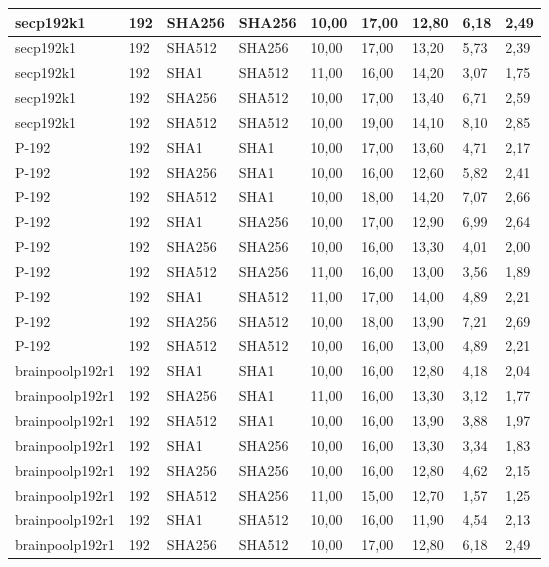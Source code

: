 \begin{longtable}{| l | l | l | l | l |l |l |l |l |}
secp192k1 & 192 & SHA256 & SHA256 & 10,00 & 17,00 & 12,80 & 6,18 & 2,49 \\ \hline 
secp192k1 & 192 & SHA512 & SHA256 & 10,00 & 17,00 & 13,20 & 5,73 & 2,39 \\ \hline 
secp192k1 & 192 & SHA1 & SHA512 & 11,00 & 16,00 & 14,20 & 3,07 & 1,75 \\ \hline 
secp192k1 & 192 & SHA256 & SHA512 & 10,00 & 17,00 & 13,40 & 6,71 & 2,59 \\ \hline 
secp192k1 & 192 & SHA512 & SHA512 & 10,00 & 19,00 & 14,10 & 8,10 & 2,85 \\ \hline 
P-192 & 192 & SHA1 & SHA1 & 10,00 & 17,00 & 13,60 & 4,71 & 2,17 \\ \hline 
P-192 & 192 & SHA256 & SHA1 & 10,00 & 16,00 & 12,60 & 5,82 & 2,41 \\ \hline 
P-192 & 192 & SHA512 & SHA1 & 10,00 & 18,00 & 14,20 & 7,07 & 2,66 \\ \hline 
P-192 & 192 & SHA1 & SHA256 & 10,00 & 17,00 & 12,90 & 6,99 & 2,64 \\ \hline 
P-192 & 192 & SHA256 & SHA256 & 10,00 & 16,00 & 13,30 & 4,01 & 2,00 \\ \hline 
P-192 & 192 & SHA512 & SHA256 & 11,00 & 16,00 & 13,00 & 3,56 & 1,89 \\ \hline 
P-192 & 192 & SHA1 & SHA512 & 11,00 & 17,00 & 14,00 & 4,89 & 2,21 \\ \hline 
P-192 & 192 & SHA256 & SHA512 & 10,00 & 18,00 & 13,90 & 7,21 & 2,69 \\ \hline 
P-192 & 192 & SHA512 & SHA512 & 10,00 & 16,00 & 13,00 & 4,89 & 2,21 \\ \hline 
brainpoolp192r1 & 192 & SHA1 & SHA1 & 10,00 & 16,00 & 12,80 & 4,18 & 2,04 \\ \hline 
brainpoolp192r1 & 192 & SHA256 & SHA1 & 11,00 & 16,00 & 13,30 & 3,12 & 1,77 \\ \hline 
brainpoolp192r1 & 192 & SHA512 & SHA1 & 10,00 & 16,00 & 13,90 & 3,88 & 1,97 \\ \hline 
brainpoolp192r1 & 192 & SHA1 & SHA256 & 10,00 & 16,00 & 13,30 & 3,34 & 1,83 \\ \hline 
brainpoolp192r1 & 192 & SHA256 & SHA256 & 10,00 & 16,00 & 12,80 & 4,62 & 2,15 \\ \hline 
brainpoolp192r1 & 192 & SHA512 & SHA256 & 11,00 & 15,00 & 12,70 & 1,57 & 1,25 \\ \hline 
brainpoolp192r1 & 192 & SHA1 & SHA512 & 10,00 & 16,00 & 11,90 & 4,54 & 2,13 \\ \hline 
brainpoolp192r1 & 192 & SHA256 & SHA512 & 10,00 & 17,00 & 12,80 & 6,18 & 2,49 \\ \hline 

\end{longtable}
